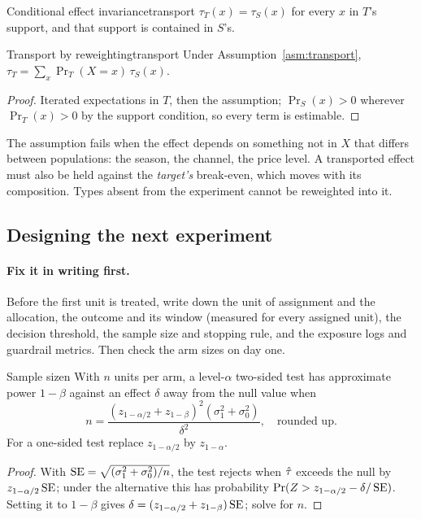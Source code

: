 \documentclass[11pt]{article}
\begin{document}
\begin{assum}{Conditional effect invariance}{transport}
$\tau_T(x) = \tau_S(x)$ for every $x$ in $T$'s support, and that support is contained in $S$'s.
\end{assum}
\begin{prop}{Transport by reweighting}{transport}
Under Assumption~\ref{asm:transport}, $\tau_T = \sum_x \Pr_T(X=x)\,\tau_S(x)$.
\end{prop}
\begin{proof}
Iterated expectations in $T$, then the assumption; $\Pr_S(x) > 0$ wherever $\Pr_T(x) > 0$ by the support
condition, so every term is estimable.
\end{proof}
The assumption fails when the effect depends on something not in $X$ that differs between populations: the
season, the channel, the price level. A transported effect must also be held against the \emph{target's}
break-even, which moves with its composition. Types absent from the experiment cannot be reweighted into it.

\subsection{Designing the next experiment}

\paragraph{Fix it in writing first.} Before the first unit is treated, write down the unit of assignment and
the allocation, the outcome and its window (measured for every assigned unit), the decision threshold, the
sample size and stopping rule, and the exposure logs and guardrail metrics. Then check the arm sizes on day one.

\begin{prop}{Sample size}{n}
With $n$ units per arm, a level-$\alpha$ two-sided test has approximate power $1-\beta$ against an effect
$\delta$ away from the null value when
\[
  n = \frac{(z_{1-\alpha/2} + z_{1-\beta})^2(\sigma_1^2 + \sigma_0^2)}{\delta^2}, \quad\text{rounded up.}
\]
For a one-sided test replace $z_{1-\alpha/2}$ by $z_{1-\alpha}$.
\end{prop}
\begin{proof}
With $\operatorname{SE} = \sqrt{(\sigma_1^2+\sigma_0^2)/n}$, the test rejects when $\hat{\tau}$ exceeds the null by
$z_{1-\alpha/2}\operatorname{SE}$; under the alternative this has probability $\Pr(Z > z_{1-\alpha/2} - \delta/\operatorname{SE})$.
Setting it to $1-\beta$ gives $\delta = (z_{1-\alpha/2} + z_{1-\beta})\operatorname{SE}$; solve for $n$.
\end{proof}
\end{document}
